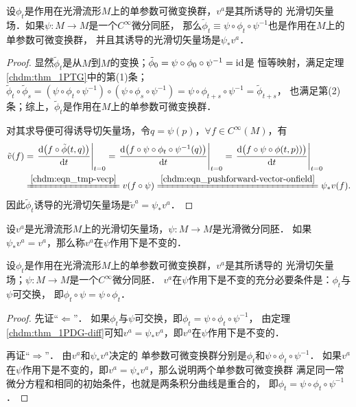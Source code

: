 \begin{theorem}\label{chdm:thm_1PDG-diff}
    设$\phi_t$是作用在光滑流形$M$上的单参数可微变换群，$v^a$是其所诱导的
    光滑切矢量场．如果$\psi:M\to M$是一个$C^\infty$微分同胚，
    那么$\tilde{\phi}_t \equiv \psi \circ \phi_t \circ \psi^{-1}$也是作用在$M$上的单参数可微变换群，
    并且其诱导的光滑切矢量场是$\psi_{*}v^a$．
\end{theorem}
\begin{proof}
    显然$\tilde{\phi}_t$是从$M$到$M$的变换；$\tilde{\phi}_0=\psi \circ \phi_0 \circ \psi^{-1}={\rm id}$是
    恒等映射，满足定理\ref{chdm:thm_1PTG}中的第(1)条；
    $\tilde{\phi}_t\circ \tilde{\phi}_s =  (\psi \circ \phi_t \circ \psi^{-1} ) \circ 
    (\psi \circ \phi_s \circ \psi^{-1}) = \psi \circ \phi_{t+s} \circ \psi^{-1}=\tilde{\phi}_{t+s}$，
    也满足第(2)条；综上，$\tilde{\phi}_t$是作用在$M$上的单参数可微变换群．
    
    对其求导便可得诱导切矢量场，令$q=\psi(p)$，$\forall f\in C^\infty (M)$，有
    \begin{align*}
        \tilde{v}(f) & = \left. \frac{{\rm d} \bigl(f \circ \tilde{\phi}(t,q)\bigr)}{{\rm d} t} \right |_{t=0}
        =\left. \frac{{\rm d} \bigl(f \circ \psi \circ \phi_t \circ \psi^{-1} (q)\bigr)}{{\rm d} t} \right |_{t=0}
        =\left. \frac{{\rm d} \bigl(f \circ \psi \circ \phi(t,p))\bigr)}{{\rm d} t} \right |_{t=0} \\
        &\xlongequal{\ref{chdm:eqn_tmp-vecp}} v(f \circ \psi)
        \xlongequal{\ref{chdm:eqn_pushforward-vector-onfield}} \psi_{*}v(f) .
    \end{align*}
    因此$\tilde{\phi}_t$诱导的光滑切矢量场是$\tilde{v}^a=\psi_{*}v^a$．
\end{proof}

\begin{definition}\label{chdm:def_invariant-vector-field}
    设$v^a$是光滑流形$M$上的光滑切矢量场，$\psi:M\to M$是光滑微分同胚．
    如果$\psi_{*}v^a=v^a$，那么称$v^a$在$\psi$作用下是不变的．
\end{definition}


\begin{proposition}\label{chdm:thm_ivf}
    设$\phi_t$是作用在光滑流形$M$上的单参数可微变换群，$v^a$是其所诱导的
    光滑切矢量场；$\psi:M\to M$是一个$C^\infty$微分同胚．
    $v^a$在$\psi$作用下是不变的充分必要条件是：$\phi_t$与$\psi$可交换，
    即$\phi_t\circ \psi = \psi \circ \phi_t$．
\end{proposition}
\begin{proof}
    先证“$\Leftarrow$”．
    如果$\phi_t$与$\psi$可交换，即${\phi}_t = \psi \circ \phi_t \circ \psi^{-1}$，
    由定理\ref{chdm:thm_1PDG-diff}可知${v}^a=\psi_{*}v^a$，即$v^a$在$\psi$作用下是不变的．
    
    再证“$\Rightarrow$”．
    由${v}^a$和$\psi_{*}v^a$决定的
    单参数可微变换群分别是${\phi}_t$和$\psi \circ \phi_t \circ \psi^{-1}$．
    如果$v^a$在$\psi$作用下是不变的，即${v}^a=\psi_{*}v^a$，那么说明两个单参数可微变换群
    满足同一常微分方程和相同的初始条件，也就是两条积分曲线是重合的，
    即${\phi}_t = \psi \circ \phi_t \circ \psi^{-1}$．
\end{proof}


